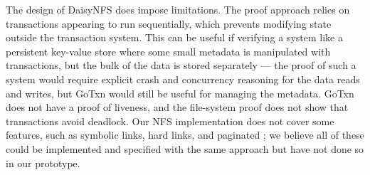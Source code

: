 The design of DaisyNFS does impose limitations. The proof approach relies on
transactions appearing to run sequentially, which prevents modifying state
outside the transaction system. This can be useful if verifying a system like a
persistent key-value store where some small metadata is manipulated with transactions, but
the bulk of the data is stored separately --- the proof of such a system would
require explicit crash and concurrency reasoning for the data reads and writes,
but GoTxn would still be useful for managing the metadata. GoTxn does not have a proof of liveness, and the file-system proof
does not show that transactions avoid deadlock. Our NFS implementation does not
cover some features, such as symbolic links, hard links, and paginated
; we believe all of these could be implemented and specified with
the same approach but have not done so in our prototype.

